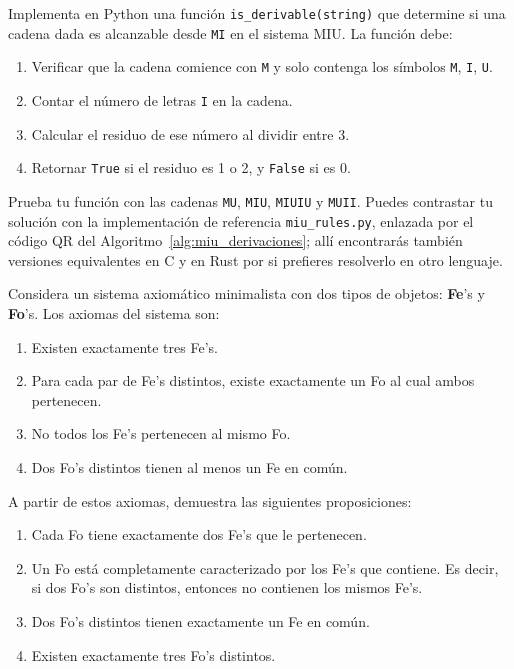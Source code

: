 \begin{exercise}
    Implementa en Python una función \texttt{is\_derivable(string)} que determine si una cadena dada es alcanzable desde
    \texttt{MI} en el sistema MIU. La función debe:
    \begin{enumerate}
        \item Verificar que la cadena comience con \texttt{M} y solo contenga los símbolos \texttt{M}, \texttt{I}, \texttt{U}.
        \item Contar el número de letras \texttt{I} en la cadena.
        \item Calcular el residuo de ese número al dividir entre 3.
        \item Retornar \texttt{True} si el residuo es 1 o 2, y \texttt{False} si es 0.
    \end{enumerate}
    Prueba tu función con las cadenas \texttt{MU}, \texttt{MIU}, \texttt{MIUIU} y \texttt{MUII}. Puedes contrastar tu
    solución con la implementación de referencia \texttt{miu\_rules.py}, enlazada por el código QR del
    Algoritmo~\ref{alg:miu_derivaciones}; allí encontrarás también versiones equivalentes en C y en Rust por si
    prefieres resolverlo en otro lenguaje.
\end{exercise}

\begin{exercise}
    \label{ex:fefo}
    Considera un sistema axiomático minimalista con dos tipos de objetos: \textbf{Fe}'s y \textbf{Fo}'s. Los axiomas
    del sistema son:
    \begin{enumerate}
        \item Existen exactamente tres Fe's.
        \item Para cada par de Fe's distintos, existe exactamente un Fo al cual ambos pertenecen.
        \item No todos los Fe's pertenecen al mismo Fo.
        \item Dos Fo's distintos tienen al menos un Fe en común.
    \end{enumerate}
    A partir de estos axiomas, demuestra las siguientes proposiciones:
    \begin{enumerate}
        \item[(a)] Cada Fo tiene exactamente dos Fe's que le pertenecen.
        \item[(b)] Un Fo está completamente caracterizado por los Fe's que contiene. Es decir, si dos Fo's son distintos,
              entonces no contienen los mismos Fe's.
        \item[(c)] Dos Fo's distintos tienen exactamente un Fe en común.
        \item[(d)] Existen exactamente tres Fo's distintos.
    \end{enumerate}
\end{exercise}

